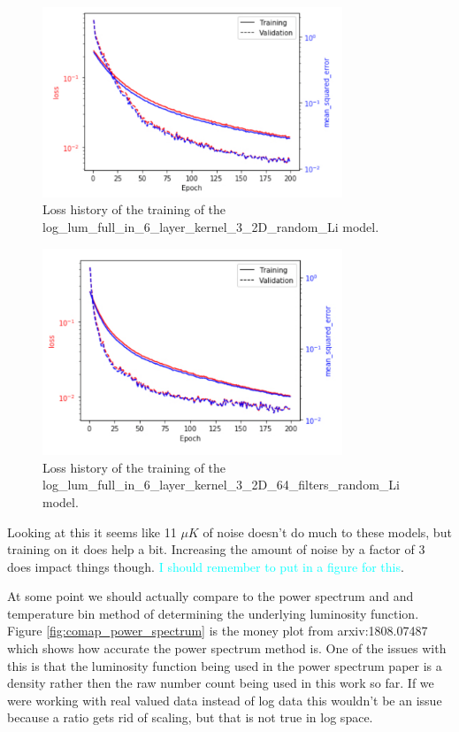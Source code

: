 \documentclass{article}
\newcommand{\dnp}[1]{\textcolor{cyan}{#1}}
\begin{document}
		\begin{figure}[H]
			\centering
			\includegraphics[width=0.8\textwidth]{log_lum_full_in_6_layer_kernel_3_2D_random_Li_history.pdf}
			\caption{Loss history of the training of the log\_lum\_full\_in\_6\_layer\_kernel\_3\_2D\_random\_Li model.}
			\label{fig:log_lum_full_in_6_layer_kernel_3_2D_random_Li_history}
		\end{figure}

		\begin{figure}[H]
			\centering
			\includegraphics[width=0.8\textwidth]{log_lum_full_in_6_layer_kernel_3_2D_64_filters_random_Li_history.pdf}
			\caption{Loss history of the training of the log\_lum\_full\_in\_6\_layer\_kernel\_3\_2D\_64\_filters\_random\_Li model.}
			\label{fig:log_lum_full_in_6_layer_kernel_3_2D_64_filters_random_Li_history}
		\end{figure}

		Looking at this it seems like 11 \(\mu K\) of noise doesn't do much to these models, but training on it does help a bit.  Increasing the amount of noise by a factor of 3 does impact things though.  \dnp{I should remember to put in a figure for this}.

		At some point we should actually compare to the power spectrum and and temperature bin method of determining the underlying luminosity function.  Figure \ref{fig:comap_power_spectrum} is the money plot from arxiv:1808.07487 which shows how accurate the power spectrum method is.  One of the issues with this is that the luminosity function being used in the power spectrum paper is a density rather then the raw number count being used in this work so far.  If we were working with real valued data instead of log data this wouldn't be an issue because a ratio gets rid of scaling, but that is not true in log space.
\end{document}
